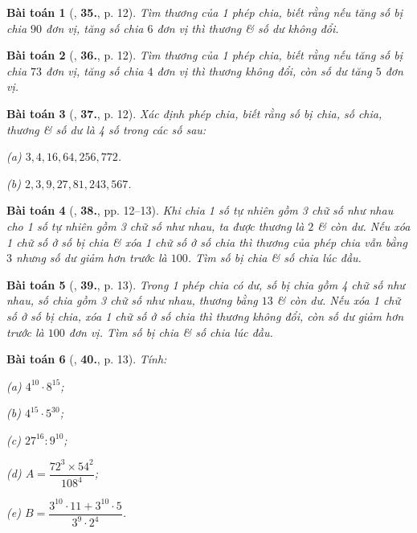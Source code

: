 \documentclass[oneside]{book}
\numberwithin{equation}{section}
\newtheorem{baitoan}{Bài toán}[section]
\begin{document}
\begin{baitoan}[\cite{Binh_Toan_6_tap_1}, \textbf{35.}, p. 12]
	Tìm thương của 1 phép chia, biết rằng nếu tăng số bị chia $90$ đơn vị, tăng số chia $6$ đơn vị thì thương \& số dư không đổi.
\end{baitoan}

\begin{baitoan}[\cite{Binh_Toan_6_tap_1}, \textbf{36.}, p. 12]
	Tìm thương của 1 phép chia, biết rằng nếu tăng số bị chia $73$ đơn vị, tăng số chia $4$ đơn vị thì thương không đổi, còn số dư tăng $5$ đơn vị.
\end{baitoan}

\begin{baitoan}[\cite{Binh_Toan_6_tap_1}, \textbf{37.}, p. 12]
	Xác định phép chia, biết rằng số bị chia, số chia, thương \& số dư là 4 số trong các số sau:
	\begin{enumerate*}
		\item[(a)] $3,4,16,64,256,772$.
		\item[(b)] $2,3,9,27,81,243,567$.
	\end{enumerate*}
\end{baitoan}

\begin{baitoan}[\cite{Binh_Toan_6_tap_1}, \textbf{38.}, pp. 12--13]
	Khi chia 1 số tự nhiên gồm 3 chữ số như nhau cho 1 số tự nhiên gồm 3 chữ số như nhau, ta được thương là $2$ \& còn dư. Nếu xóa 1 chữ số ở số bị chia \& xóa 1 chữ số ở số chia thì thương của phép chia vẫn bằng $3$ nhưng số dư giảm hơn trước là $100$. Tìm số bị chia \& số chia lúc đầu.
\end{baitoan}

\begin{baitoan}[\cite{Binh_Toan_6_tap_1}, \textbf{39.}, p. 13]
	Trong 1 phép chia có dư, số bị chia gồm 4 chữ số như nhau, số chia gồm 3 chữ số như nhau, thương bằng $13$ \& còn dư. Nếu xóa 1 chữ số ở số bị chia, xóa 1 chữ số ở số chia thì thương không đổi, còn số dư giảm hơn trước là $100$ đơn vị. Tìm số bị chia \& số chia lúc đầu.
\end{baitoan}

\begin{baitoan}[\cite{Binh_Toan_6_tap_1}, \textbf{40.}, p. 13]
	Tính:\\
	\begin{enumerate*}
		\item[(a)] $4^{10}\cdot 8^{15}$;
		\item[(b)] $4^{15}\cdot 5^{30}$;
		\item[(c)] $27^{16}:9^{10}$;
		\item[(d)] $A = \dfrac{72^3\times 54^2}{108^4}$;
		\item[(e)] $B = \dfrac{3^{10}\cdot 11 + 3^{10}\cdot 5}{3^9\cdot 2^4}$.
	\end{enumerate*}
\end{baitoan}
\end{document}
